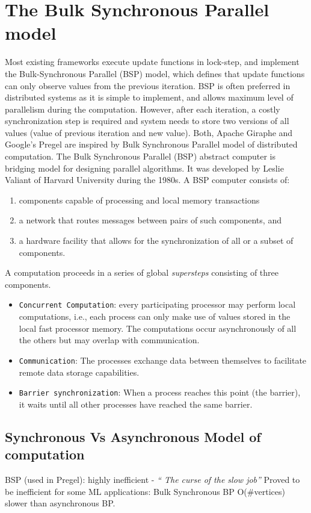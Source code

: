 \documentclass[letterpaper,twocolumn,10pt]{article}
\begin{document}
\section*{The Bulk Synchronous Parallel model}
\label{sec:bsp}
Most existing frameworks execute update functions in lock-step, and implement the Bulk-Synchronous Parallel (BSP) model, which defines that update functions can only observe values from the previous iteration. BSP is often preferred in distributed systems as it is simple to implement, and allows maximum level of parallelism during the computation. However, after each iteration, a costly synchronization step is required and system needs to store two versions of all values (value of previous iteration and new value).
Both, Apache Giraphe and Google's Pregel are inspired by Bulk Synchronous Parallel model of distributed computation.
The Bulk Synchronous Parallel (BSP) abstract computer is bridging model for designing parallel algorithms. It was developed by Leslie Valiant of Harvard University during the 1980s. A BSP computer consists of:
\begin{enumerate}
\item components capable of processing and local memory transactions
\item a network that routes messages between pairs of such components, and
\item a hardware facility that allows for the synchronization of all or a subset of components.
\end{enumerate}
A computation proceeds in a series of global \textit{supersteps} consisting of three components.
\begin{itemize}
\item {\tt Concurrent Computation}: every participating processor may perform local computations, i.e., each process can only make use of values stored in the local fast processor memory. The computations occur asynchronously of all the others but may overlap with communication.
\item {\tt Communication}: The processes exchange data between themselves to facilitate remote data storage capabilities.
\item {\tt Barrier synchronization}: When a process reaches this point (the barrier), it waits until all other processes have reached the same barrier.
\end{itemize}

\subsection*{Synchronous Vs Asynchronous Model of computation}
BSP (used in Pregel): highly inefficient - \textit{`` The curse of the slow job''}
Proved to be inefficient for some ML applications:
	Bulk Synchronous BP O(\#vertices) slower than asynchronous BP.

{\footnotesize 
}


\theendnotes
\end{document}

